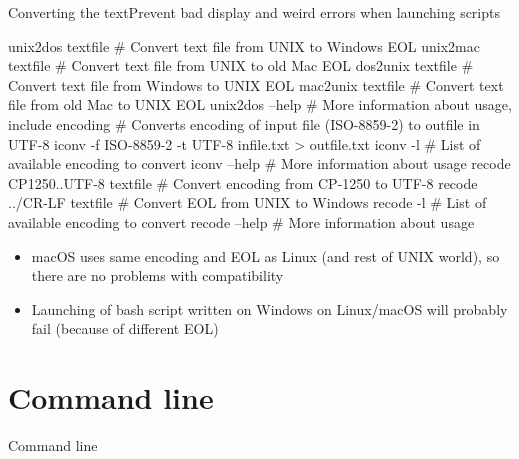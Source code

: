 \documentclass[compress, ucs, xelatex, 11pt, xcolor=svgnames,
  hyperref={
    bookmarks=true,
    unicode=true,
    colorlinks=true,
    pdftitle={Linux, command line and MetaCentrum},
    plainpages=false,
    pdfauthor={Vojtech Zeisek},
    pdfsubject={Course about use of Linux command line, writing shell scripts and using MetaCentrum of CESNET},
    pdfcreator={XeLaTeX},
    pdfkeywords={Linux, GNU, BASH, shell, command line, MetaCentrum},
    linkcolor=DarkRed,
    anchorcolor=DarkBlue,
    citecolor=Indigo,
    filecolor=NavyBlue,
    menucolor=DarkMagenta,
    urlcolor=DarkBlue,
    pdftex},
  url={hyphens, lowtilde} %
  ]{beamer}
\begin{document}
\begin{frame}[fragile]{Converting the text}{Prevent bad display and weird errors when launching scripts}
  \begin{bashcode}
    unix2dos textfile # Convert text file from UNIX to Windows EOL
    unix2mac textfile # Convert text file from UNIX to old Mac EOL
    dos2unix textfile # Convert text file from Windows to UNIX EOL
    mac2unix textfile # Convert text file from old Mac to UNIX EOL
    unix2dos --help # More information about usage, include encoding
    # Converts encoding of input file (ISO-8859-2) to outfile in UTF-8
    iconv -f ISO-8859-2 -t UTF-8 infile.txt > outfile.txt
    iconv -l # List of available encoding to convert
    iconv --help # More information about usage
    recode CP1250..UTF-8 textfile # Convert encoding from CP-1250 to UTF-8
    recode ../CR-LF textfile # Convert EOL from UNIX to Windows
    recode -l # List of available encoding to convert
    recode --help # More information about usage
  \end{bashcode}
  \begin{itemize}
    \item macOS uses same encoding and EOL as Linux (and rest of UNIX world), so there are no problems with compatibility
    \item Launching of bash script written on Windows on Linux/macOS will probably fail (because of different EOL)
  \end{itemize}
\end{frame}

\section{Command line}

\begin{frame}{Command line}
  \tableofcontents[currentsection, sectionstyle=show/hide, hideothersubsections]
\end{frame}
\end{document}
